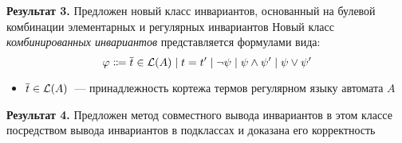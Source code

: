 \begin{frame}{\textbf{Результат 3.} Предложен новый класс инвариантов, основанный на булевой комбинации элементарных и регулярных инвариантов}
Новый класс \emph{комбинированных инвариантов} представляется формулами вида:
$$\varphi \Coloneqq \overline{t}\in \mathcal{L}(A) \mid t = t' \mid \neg\psi \mid \psi \land \psi' \mid \psi \lor \psi'$$
\vspace*{-8mm}
\begin{itemize}
    \item $\overline{t}\in \mathcal{L}(A)$~--- принадлежность кортежа термов регулярном языку автомата $A$
\end{itemize}
\end{frame}

\begin{frame}{\textbf{Результат 4.} Предложен метод совместного вывода инвариантов в этом классе посредством вывода инвариантов в подклассах и доказана его корректность}
\whenFullCompile{\centering\ciciPic}
\end{frame}


